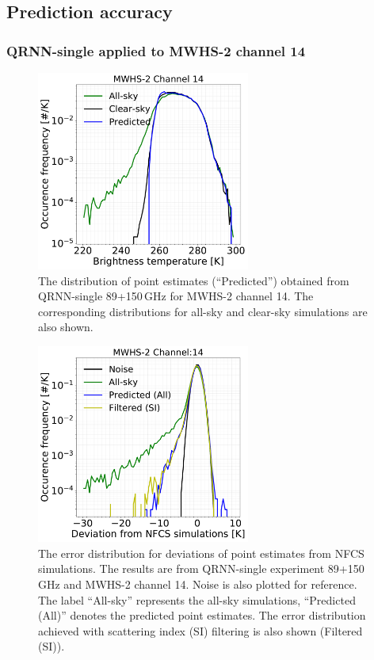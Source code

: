 \documentclass[amt, manuscript]{copernicus}
\begin{document}
\subsection{Prediction accuracy}

\subsubsection{QRNN-single applied to MWHS-2 channel 14} 
\begin{figure}[t]
	\centering
	\includegraphics[width = 70mm]{Figures/fig02.pdf} 
	\caption{The distribution of point estimates (``Predicted'') obtained from QRNN-single 89+150\,GHz for MWHS-2 channel 14. The corresponding distributions for all-sky and clear-sky simulations are also shown.}
	\label{fig:distribution_predicted_mwhs14}	
\end{figure}
\begin{figure}[t]
	\centering
	\includegraphics[width = 70mm]{Figures/fig03.pdf} 
	\caption{The error distribution for deviations of point estimates from NFCS simulations. The results are from QRNN-single experiment 89+150\,GHz and MWHS-2 channel 14. Noise is also plotted for reference. The label ``All-sky'' represents the all-sky simulations, ``Predicted (All)'' denotes the predicted point estimates. The error distribution achieved with scattering index (SI) filtering is also shown (Filtered (SI)). }
	\label{fig:error_distribution_mwhs14}	
\end{figure}
\end{document}

